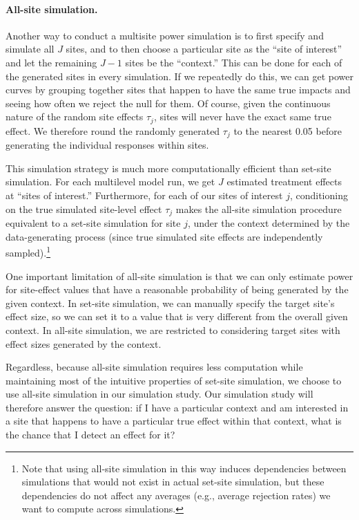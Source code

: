 \documentclass[]{article}
\begin{document}
\paragraph{All-site simulation.} Another way to conduct a multisite power simulation is to first specify and simulate all $J$ sites, and to then choose a particular site as the ``site of interest'' and let the remaining $J-1$ sites be the ``context.''
This can be done for each of the generated sites in every simulation.
If we repeatedly do this, we can get power curves by grouping together sites that happen to have the same true impacts and seeing how often we reject the null for them.
Of course, given the continuous nature of the random site effects $\tau_j$, sites will never have the exact same true effect.
We therefore round the randomly generated $\tau_j$ to the nearest 0.05 before generating the individual responses within sites.

This simulation strategy is much more computationally efficient than set-site simulation.
For each multilevel model run, we get $J$ estimated treatment effects at ``sites of interest.''
Furthermore, for each of our sites of interest $j$, conditioning on the true simulated site-level effect $\tau_j$ makes the all-site simulation procedure equivalent to a set-site simulation for site $j$, under the context determined by the data-generating process (since true simulated site effects are independently sampled).\footnote{Note that using all-site simulation in this way induces dependencies between simulations that would not exist in actual set-site simulation, but these dependencies do not affect any averages (e.g., average rejection rates) we want to compute across simulations.}

One important limitation of all-site simulation is that we can only estimate power for site-effect values that have a reasonable probability of being generated by the given context.
In set-site simulation, we can manually specify the target site's effect size, so we can set it to a value that is very different from the overall given context.
In all-site simulation, we are restricted to considering target sites with effect sizes generated by the context.

Regardless, because all-site simulation requires less computation while maintaining most of the intuitive properties of set-site simulation, we choose to use all-site simulation in our simulation study.
Our simulation study will therefore answer the question: if I have a particular context and am interested in a site that happens to have a particular true effect within that context, what is the chance that I detect an effect for it?
\end{document}
